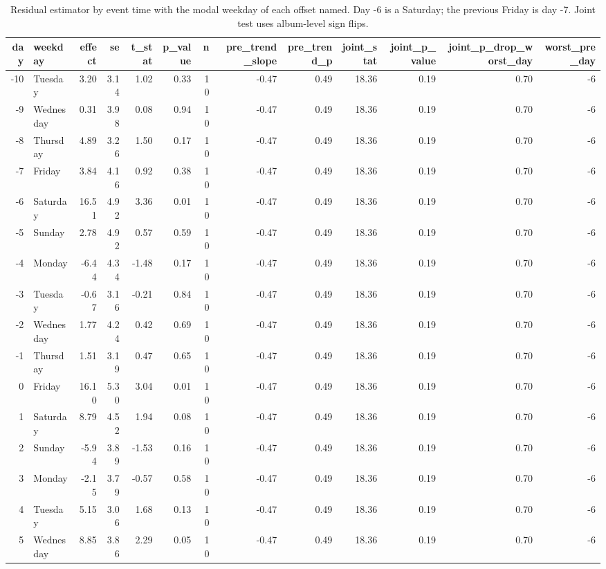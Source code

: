\begin{table}
\caption{Residual estimator by event time with the modal weekday of each offset named. Day -6 is a Saturday; the previous Friday is day -7. Joint test uses album-level sign flips.}
\begin{tabular}{rlrrrrrrrrrrr}
\toprule
day & weekday & effect & se & t\_stat & p\_value & n & pre\_trend\_slope & pre\_trend\_p & joint\_stat & joint\_p\_value & joint\_p\_drop\_worst\_day & worst\_pre\_day \\
\midrule
-10 & Tuesday & 3.20 & 3.14 & 1.02 & 0.33 & 10 & -0.47 & 0.49 & 18.36 & 0.19 & 0.70 & -6 \\
-9 & Wednesday & 0.31 & 3.98 & 0.08 & 0.94 & 10 & -0.47 & 0.49 & 18.36 & 0.19 & 0.70 & -6 \\
-8 & Thursday & 4.89 & 3.26 & 1.50 & 0.17 & 10 & -0.47 & 0.49 & 18.36 & 0.19 & 0.70 & -6 \\
-7 & Friday & 3.84 & 4.16 & 0.92 & 0.38 & 10 & -0.47 & 0.49 & 18.36 & 0.19 & 0.70 & -6 \\
-6 & Saturday & 16.51 & 4.92 & 3.36 & 0.01 & 10 & -0.47 & 0.49 & 18.36 & 0.19 & 0.70 & -6 \\
-5 & Sunday & 2.78 & 4.92 & 0.57 & 0.59 & 10 & -0.47 & 0.49 & 18.36 & 0.19 & 0.70 & -6 \\
-4 & Monday & -6.44 & 4.34 & -1.48 & 0.17 & 10 & -0.47 & 0.49 & 18.36 & 0.19 & 0.70 & -6 \\
-3 & Tuesday & -0.67 & 3.16 & -0.21 & 0.84 & 10 & -0.47 & 0.49 & 18.36 & 0.19 & 0.70 & -6 \\
-2 & Wednesday & 1.77 & 4.24 & 0.42 & 0.69 & 10 & -0.47 & 0.49 & 18.36 & 0.19 & 0.70 & -6 \\
-1 & Thursday & 1.51 & 3.19 & 0.47 & 0.65 & 10 & -0.47 & 0.49 & 18.36 & 0.19 & 0.70 & -6 \\
0 & Friday & 16.10 & 5.30 & 3.04 & 0.01 & 10 & -0.47 & 0.49 & 18.36 & 0.19 & 0.70 & -6 \\
1 & Saturday & 8.79 & 4.52 & 1.94 & 0.08 & 10 & -0.47 & 0.49 & 18.36 & 0.19 & 0.70 & -6 \\
2 & Sunday & -5.94 & 3.89 & -1.53 & 0.16 & 10 & -0.47 & 0.49 & 18.36 & 0.19 & 0.70 & -6 \\
3 & Monday & -2.15 & 3.79 & -0.57 & 0.58 & 10 & -0.47 & 0.49 & 18.36 & 0.19 & 0.70 & -6 \\
4 & Tuesday & 5.15 & 3.06 & 1.68 & 0.13 & 10 & -0.47 & 0.49 & 18.36 & 0.19 & 0.70 & -6 \\
5 & Wednesday & 8.85 & 3.86 & 2.29 & 0.05 & 10 & -0.47 & 0.49 & 18.36 & 0.19 & 0.70 & -6 \\

\end{tabular}
\end{table}
